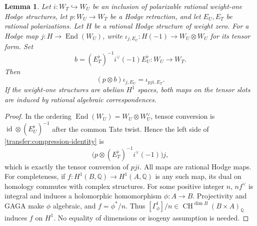 \documentclass[11pt]{amsart}
\newcommand{\Q}{\mathbb Q}
\DeclareMathOperator{\CH}{CH}
\DeclareMathOperator{\End}{End}
\DeclareMathOperator{\id}{id}
\newtheorem{lemma}[theorem]{Lemma}
\theoremstyle{definition}
\theoremstyle{remark}
\numberwithin{equation}{section}
\begin{document}
\begin{lemma}\label{transfer:compression}
Let $i:W_T\hookrightarrow W_U$ be an inclusion of polarizable rational
weight-one Hodge structures, let $p:W_U\to W_T$ be a Hodge retraction,
and let $E_U,E_T$ be rational polarizations.  Let $H$ be a rational
Hodge structure of weight zero.  For a Hodge map
$j:H\to\End(W_U)$, write
$\iota_{j,E_U}:H(-1)\to W_U\otimes W_U$ for its tensor form.
Set
\[
 b=(E_T^\flat)^{-1}i^\vee(-1)E_U^\flat:W_U\longrightarrow W_T.
\]
Then
\begin{equation}\label{transfer:compression-identity}
 (p\otimes b)\iota_{j,E_U}=\iota_{pji,E_T}.
\end{equation}
If the weight-one structures are abelian $H^1$ spaces, both maps on
the tensor slots are induced by rational algebraic correspondences.
\end{lemma}
\begin{proof}
In the ordering $\End(W_U)=W_U\otimes W_U^\vee$, tensor conversion
is $\id\otimes(E_U^\flat)^{-1}$ after the common Tate twist.  Hence
the left side of \eqref{transfer:compression-identity} is
\[
 \bigl(p\otimes(E_T^\flat)^{-1}i^\vee(-1)\bigr)j,
\]
which is exactly the tensor conversion of $pji$.  All maps are rational
Hodge maps.  For completeness, if $f:H^1(B,\Q)\to H^1(A,\Q)$ is any
such map, its dual on homology commutes with complex structures.
For some positive integer $n$, $nf^\vee$ is integral and induces a
holomorphic homomorphism $\phi:A\to B$.  Projectivity and GAGA make
$\phi$ algebraic, and $f=\phi^*/n$.  Thus
$[\Gamma_\phi^t]/n\in\CH^{\dim B}(B\times A)_{\Q}$ induces $f$
on $H^1$.  No equality of dimensions or isogeny assumption is needed.
\end{proof}
\end{document}
